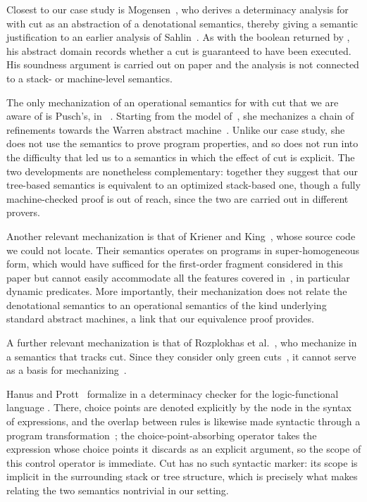 \documentclass[sigplan,10pt,anonymous,review]{acmart}
\begin{document}
Closest to our case study is Mogensen~\cite{1996mogensen}, who derives a
determinacy analysis for \prologP with cut as an abstraction of a denotational
semantics, thereby giving a semantic justification to an earlier analysis of
Sahlin~\cite{1991Sahlin}. As with the boolean returned by \run{}, his abstract
domain records whether a cut is guaranteed to have been executed. His soundness
argument is carried out on paper and the analysis is not connected to a stack- or
machine-level semantics. %

The only mechanization of an operational semantics for \prologP with cut that we
are aware of is Pusch's, in \isabelleP~\cite{10.1007/BFb0105415}. Starting from
the model of~\cite{BorgerRosenzweig1995}, she mechanizes a chain of refinements
towards the Warren abstract machine~\cite{warren1983abstract,1991ait-wam}.
Unlike our case study, she does not use the semantics to prove program
properties, and so does not run into the difficulty
that led us to a semantics in which the effect of cut is
explicit. The two developments are nonetheless complementary: together they
suggest that our tree-based semantics is equivalent to an optimized stack-based
one, though a fully machine-checked proof is out of reach, since the two are
carried out in different provers.

Another relevant mechanization is that of Kriener and King~\cite{2011king}, whose
\rocqP{} source code we could not locate. Their semantics operates on programs in
super-homogeneous form, which would have sufficed for the first-order fragment
considered in this paper but cannot easily accommodate all the features covered
in~\cite{fissore2026}, in particular dynamic predicates. More importantly, their
mechanization does not relate the denotational semantics to an operational
semantics of the kind underlying standard \prologP abstract machines, a link that
our equivalence proof provides. 

A further relevant mechanization is that of Rozplokhas et
al.~\cite{miniKanren}, who mechanize in \rocqP{} a semantics that tracks cut.
Since they consider only green cuts~\cite[Appendix C]{miniKanren}, it cannot
serve as a basis for
mechanizing~\cite{fissore2026}.

Hanus and Prott~\cite{hanus2025} formalize in \rocqP{} a determinacy checker for
the logic-functional language \curryP. There, choice points are denoted
explicitly by the  node in the syntax of expressions, and the overlap
between rules is likewise made syntactic through a program
transformation~\cite{progr_transformation}; the choice-point-absorbing operator
 takes the expression whose choice points it discards as an
explicit argument, so the scope of this control operator is immediate. Cut has no
such syntactic marker: its scope is implicit in the surrounding stack or tree
structure, which is precisely what makes relating the two semantics nontrivial in
our setting.
\end{document}
